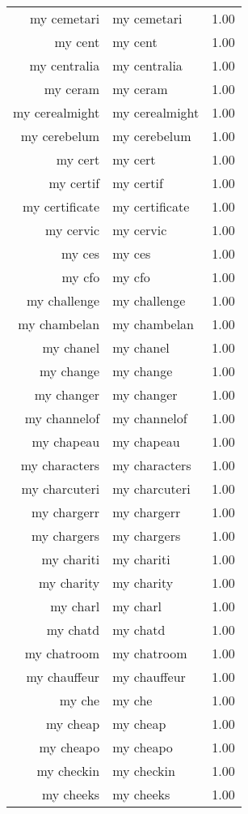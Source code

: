 \begin{table}[ht]
\begin{tabular}{rlr}
  my cemetari & my cemetari & 1.00 \\ 
  my cent & my cent & 1.00 \\ 
  my centralia & my centralia & 1.00 \\ 
  my ceram & my ceram & 1.00 \\ 
  my cerealmight & my cerealmight & 1.00 \\ 
  my cerebelum & my cerebelum & 1.00 \\ 
  my cert & my cert & 1.00 \\ 
  my certif & my certif & 1.00 \\ 
  my certificate & my certificate & 1.00 \\ 
  my cervic & my cervic & 1.00 \\ 
  my ces & my ces & 1.00 \\ 
  my cfo & my cfo & 1.00 \\ 
  my challenge & my challenge & 1.00 \\ 
  my chambelan & my chambelan & 1.00 \\ 
  my chanel & my chanel & 1.00 \\ 
  my change & my change & 1.00 \\ 
  my changer & my changer & 1.00 \\ 
  my channelof & my channelof & 1.00 \\ 
  my chapeau & my chapeau & 1.00 \\ 
  my characters & my characters & 1.00 \\ 
  my charcuteri & my charcuteri & 1.00 \\ 
  my chargerr & my chargerr & 1.00 \\ 
  my chargers & my chargers & 1.00 \\ 
  my chariti & my chariti & 1.00 \\ 
  my charity & my charity & 1.00 \\ 
  my charl & my charl & 1.00 \\ 
  my chatd & my chatd & 1.00 \\ 
  my chatroom & my chatroom & 1.00 \\ 
  my chauffeur & my chauffeur & 1.00 \\ 
  my che & my che & 1.00 \\ 
  my cheap & my cheap & 1.00 \\ 
  my cheapo & my cheapo & 1.00 \\ 
  my checkin & my checkin & 1.00 \\ 
  my cheeks & my cheeks & 1.00 \\ 

\end{tabular}
\end{table}
